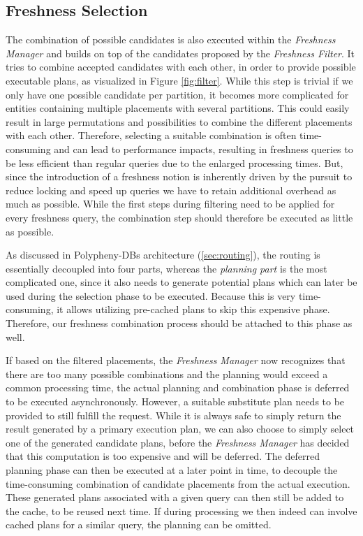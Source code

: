 

\subsection{Freshness Selection}
\label{sec:fresh_select}

The combination of possible candidates is also executed within the \emph{Freshness Manager} and builds on top of the candidates proposed by the \emph{Freshness Filter}.
It tries to combine accepted candidates with each other, in order to provide possible executable plans, as visualized in Figure \ref{fig:filter}.
While this step is trivial if we only have one possible candidate per partition, it becomes more complicated for entities containing multiple placements 
with several partitions. This could easily result in large permutations and possibilities to combine the different placements with each other.
Therefore, selecting a suitable combination is often time-consuming and can lead to performance impacts, 
resulting in freshness queries to be less efficient than regular queries due to the enlarged processing times. 
But, since the introduction of a freshness notion is inherently driven by the pursuit to reduce locking and speed up queries we have to 
retain additional overhead as much as possible. 
While the first steps during filtering need to be applied for every freshness query, the combination step should therefore be executed as little as possible.

As discussed in Polypheny-DBs architecture (\ref{sec:routing}), the routing is essentially decoupled into four parts,
whereas the \emph{planning part} is the most complicated one, since it also needs to generate potential plans which can later be used during the selection phase 
to be executed. Because this is very time-consuming, it allows utilizing pre-cached plans to skip this expensive phase.
Therefore, our freshness combination process should be attached to this phase as well.

If based on the filtered placements, the \emph{Freshness Manager} now recognizes that there are too many possible combinations and the planning would 
exceed a common processing time, the actual planning and combination phase is deferred to be executed asynchronously.
However, a suitable substitute plan needs to be provided to still fulfill the request.
While it is always safe to simply return the result generated by a primary execution plan, we can also choose to simply select one of the generated candidate plans, before
the \emph{Freshness Manager} has decided that this computation is too expensive and will be deferred. 
The deferred planning phase can then be executed at a later point in time, to decouple the time-consuming combination of candidate placements from the actual execution.
These generated plans associated with a given query can then still be added to the cache, to be reused next time.
If during processing we then indeed can involve cached plans for a similar query, the planning can be omitted.

